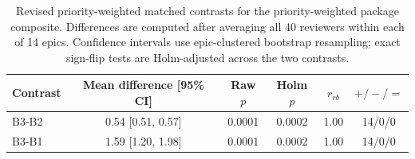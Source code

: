 \begin{table}[t]
\caption{Revised priority-weighted matched contrasts for the priority-weighted package composite. Differences are computed after averaging all 40 reviewers within each of 14 epics. Confidence intervals use epic-clustered bootstrap resampling; exact sign-flip tests are Holm-adjusted across the two contrasts.}
\label{tab:matched-review-pairwise}
\centering
\small
\begin{tabular}{lccccc}
\toprule
Contrast & Mean difference [95\% CI] & Raw $p$ & Holm $p$ & $r_{rb}$ & $+/-/=$ \\ 
\midrule
B3-B2 & 0.54 [0.51, 0.57] & 0.0001 & 0.0002 & 1.00 & 14/0/0 \\
B3-B1 & 1.59 [1.20, 1.98] & 0.0001 & 0.0002 & 1.00 & 14/0/0 \\
\bottomrule
\end{tabular}
\end{table}
